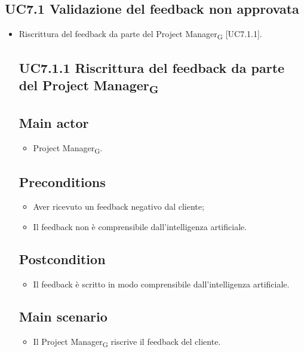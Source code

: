 \documentclass{article}
\begin{document}
    \subsection{UC7.1 Validazione del feedback non approvata}
    \begin{itemize}
        \item Riscrittura del feedback da parte del Project Manager\textsubscript{G}  [UC7.1.1].
        \subsection*{UC7.1.1 Riscrittura del feedback da parte del Project Manager\textsubscript{G} }
     \subsection*{Main actor}
         \begin{itemize}
             \item Project Manager\textsubscript{G}.
         \end{itemize}
     \subsection*{Preconditions} 
        \begin{itemize}
            \item Aver ricevuto un feedback negativo dal cliente;
            \item Il feedback non è comprensibile dall'intelligenza artificiale.
        \end{itemize}
        \subsection*{Postcondition} 
        \begin{itemize}
            \item Il feedback è scritto in modo comprensibile dall'intelligenza artificiale.
        \end{itemize}
        \subsection*{Main scenario}
        \begin{itemize}
        \item Il Project Manager\textsubscript{G} riscrive il feedback del cliente.
        \end{itemize}
    \end{itemize}
    
\end{document}
